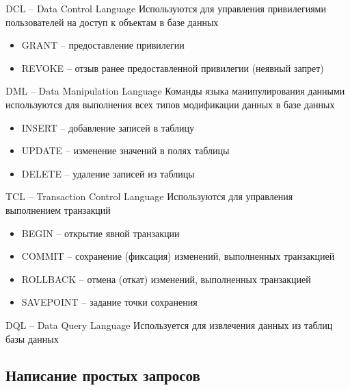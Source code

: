 \documentclass[12pt]{article}
\begin{document}
\begin{Remark}{DCL -- Data Control Language}
    Используются для управления привилегиями пользователей на доступ к объектам в базе данных
    
    \begin{itemize}
        \item GRANT -- предоставление привилегии 
        \item REVOKE -- отзыв ранее предоставленной привилегии (неявный запрет)
    \end{itemize}
\end{Remark}

\begin{Remark}{DML -- Data Manipulation Language}
    Команды языка манипулирования данными используются для выполнения всех типов модификации данных в базе данных 

    \begin{itemize}
        \item INSERT -- добавление записей в таблицу
        \item UPDATE -- изменение значений в полях таблицы
        \item DELETE -- удаление записей из таблицы
    \end{itemize}
\end{Remark}

\begin{Remark}{TCL -- Transaction Control Language}
    Используются для управления выполнением транзакций

    \begin{itemize}
        \item BEGIN -- открытие явной транзакции 
        \item COMMIT -- сохранение (фиксация) изменений, выполненных транзакцией
        \item ROLLBACK -- отмена (откат) изменений, выполненных транзакцией
        \item SAVEPOINT -- задание точки сохранения
    \end{itemize}
\end{Remark}

\begin{Remark}{DQL -- Data Query Language}
    Используется для извлечения данных из таблиц базы данных
\end{Remark}

\newpage 

\subsection{Написание простых запросов}
\end{document}
